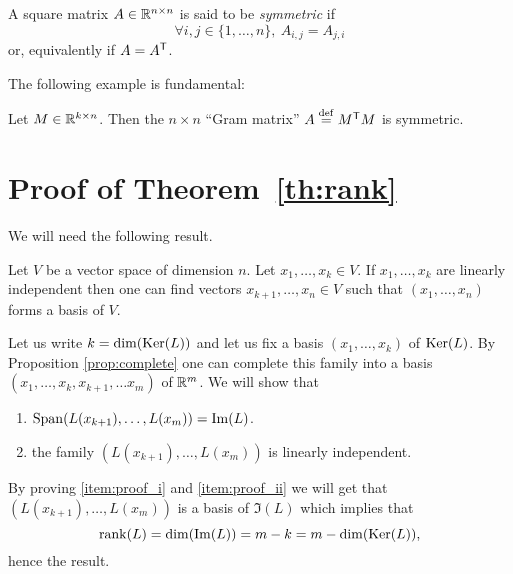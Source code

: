 \documentclass[11pt,nocut]{article}
\begin{document}
\begin{definition}
	A square matrix $A \in \mathbb{R}^{n \times n}$ is said to be \emph{symmetric} if
	$$
	\forall i,j \in \{1, \dots, n\}, \ A_{i,j} = A_{j,i}
	$$
	or, equivalently if $A = A^{{\sf T}}$.
\end{definition}

The following example is fundamental:
\begin{example}
	Let $M \in \mathbb{R}^{k \times n}$. Then the $n\times n$ ``Gram matrix'' $A \overset{\rm def}{=} M^{{\sf T}} M$ is symmetric.
\end{example}

\section*{Proof of Theorem~\ref{th:rank}}
	We will need the following result.
\begin{proposition}\label{prop:complete}
	Let $V$ be a vector space of dimension $n$.
	Let $x_1, \dots, x_k \in V$. 
	If $x_1, \dots, x_k$  are linearly independent then one can find vectors $x_{k+1}, \dots, x_{n} \in V$ such that $(x_1, \dots, x_n)$ forms a basis of $V$.
\end{proposition}

	Let us write $k = {{\rm dim}}({{\rm Ker}}(L))$ and let us fix a basis $(x_1, \dots, x_k)$ of ${{\rm Ker}}(L)$. By Proposition \ref{prop:complete} one can complete this family into a basis $(x_1, \dots, x_k, x_{k+1}, \dots x_m)$ of $\mathbb{R}^m$.
	We will show that
	\begin{enumerate}[label=(\roman*)]
		\item \label{item:proof_i} ${{\rm Span}}(L(x_{k+1}), \dots, L(x_m)) = {{\rm Im}}(L)$.
		\item \label{item:proof_ii} the family $(L(x_{k+1}), \dots, L(x_{m}))$ is linearly independent.
	\end{enumerate}

	By proving \ref{item:proof_i} and \ref{item:proof_ii} we will get that $(L(x_{k+1}), \dots, L(x_{m}))$ is a basis of $\Im(L)$ which implies that 
	$$
	{{\rm rank}}(L) = {{\rm dim}}({{\rm Im}}(L)) = m - k = m - {{\rm dim}}({{\rm Ker}}(L)),
	$$
	hence the result.
\\
\end{document}
